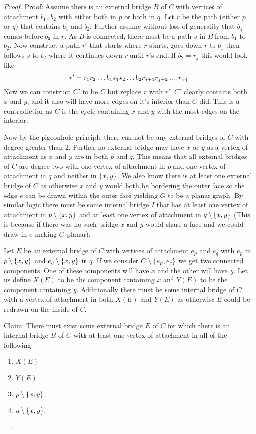 \documentclass{article}
\begin{document}
\begin{proof}
	Proof: Assume there is an external bridge $B$ of $C$ with vertices of attachment $b_1$, $b_2$ with either both in $p$ or both in $q$. Let $r$ be the path (either $p$ or $q$) that contains $b_1$ and $b_2$. Further assume without loss of generality that $b_1$ comes before $b_2$ in $r$. As $B$ is connected, there must be a path $s$ in $B$ from $b_1$ to $b_2$. Now construct a path $r'$ that starts where $r$ starts, goes down $r$ to $b_1$ then follows $s$ to $b_2$ where it continues down $r$ until $r$'s end. If $b_2 = r_j$ this would look like
	$$
	r' = r_1r_2\ldots b_1s_1s_2\ldots b_2r_{j+1}r_{j+2}\ldots r_{\left| {r} \right|}
	$$
	Now we can construct $C'$ to be $C$ but replace $r$ with $r'$. $C'$ clearly contains both $x$ and $y$, and it also will have more edges on it's interior than $C$ did. This is a contradiction as $C$ is the cycle containing $x$ and $y$ with the most edges on the interior.
	
	Now by the pigeonhole principle there can not be any external bridges of $C$ with degree greater than 2. Further no external bridge may have $x$ or $y$ as a vertex of attachment as $x$ and $y$ are in both $p$ and $q$. This means that all external bridges of $C$ are degree two with one vertex of attachment in $p$ and one vertex of attachment in $q$ and neither in $\left\{ {x,y} \right\}$. We also know there is at least one external bridge of $C$ as otherwise $x$ and $y$ would both be bordering the outer face so the edge $e$ can be drawn within the outer face yielding $G$ to be a planar graph. By similar logic there must be some internal bridge $I$ that has at least one vertex of attachment in $p\setminus\left\{ {x,y} \right\}$ and at least one vertex of attachment in $q\setminus\left\{ {x,y} \right\}$ (This is because if there was no such bridge $x$ and $y$ would share a face and we could draw in $e$ making $G$ planar).
	
	Let $E$ be an external bridge of $C$ with vertices of attachment $e_p$ and $e_q$ with $e_p$ in $p\setminus\left\{ {x,y} \right\}$ and $e_q\setminus\left\{ {x,y} \right\}$ in $q$. If we consider $C\setminus\left\{ {e_p,e_q} \right\}$ we get two connected components. One of these components will have $x$ and the other will have $y$. Let us define $X(E)$ to be the component containing $x$ and $Y(E)$ to be the component containing $y$. Additionally there must be some internal bridge of $C$ with a vertex of attachment in both $X(E)$ and $Y(E)$ as otherwise $E$ could be redrawn on the inside of $C$.
	
	Claim: There must exist some external bridge $E$ of $C$ for which there is an internal bridge $B$ of $C$ with at least one vertex of attachment in all of the following:
	\begin{enumerate}
		\item $X(E)$
		\item $Y(E)$
		\item $p\setminus\left\{ {x,y} \right\}$
		\item $q\setminus\left\{ {x,y} \right\}$.
	\end{enumerate}


\end{proof}
\end{document}
